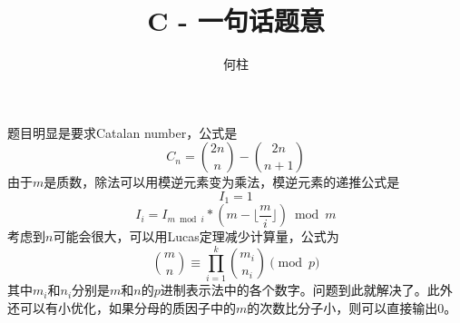 \documentclass[a4paper]{ctexart}
\title{C - 一句话题意}
\author{何柱}
\begin{document}
	\maketitle
	题目明显是要求Catalan number，公式是
	$$C_n=\binom{2n}{n}-\binom{2n}{n+1}$$
	由于$m$是质数，除法可以用模逆元素变为乘法，模逆元素的递推公式是
	$$I_1=1$$
	$$I_i=I_{m\bmod i}*(m-\lfloor\frac{m}{i}\rfloor)\bmod m$$
	考虑到$n$可能会很大，可以用Lucas定理减少计算量，公式为
	$$\binom{m}{n}\equiv\prod_{i=1}^{k}\binom{m_i}{n_i}\pmod{p}$$
	其中$m_i$和$n_i$分别是$m$和$n$的$p$进制表示法中的各个数字。问题到此就解决了。此外还可以有小优化，如果分母的质因子中的$m$的次数比分子小，则可以直接输出0。
\end{document}
